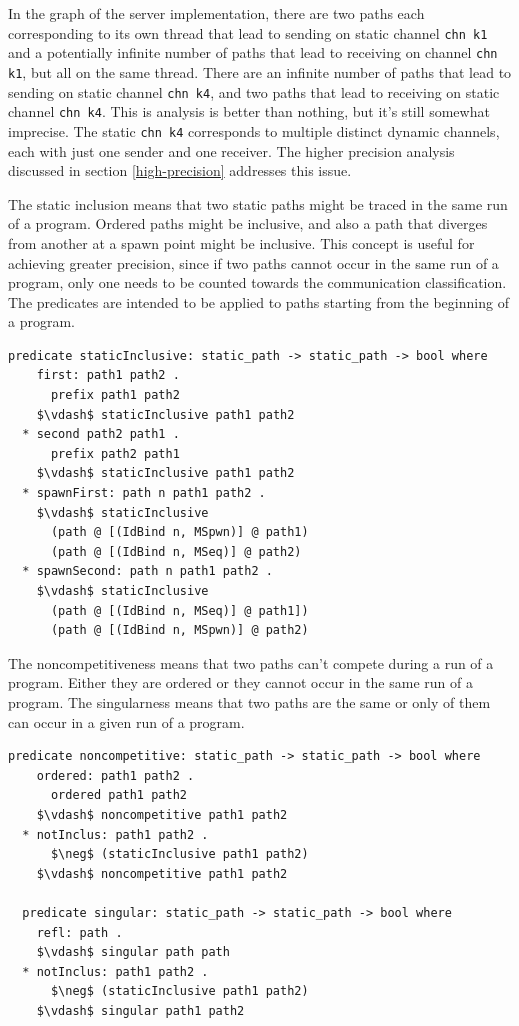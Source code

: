 \documentclass[letterpaper, 11pt]{report}
\begin{document}
In the graph of the server implementation, there are two paths each corresponding to its
own thread that lead
to sending on
static channel \lstinline[language=sugar_lang]{chn k1} and a potentially infinite number of
paths that lead to receiving on
channel \lstinline[language=sugar_lang]{chn k1}, but all on the same thread.
There are an infinite number of paths that lead
to sending on static channel \lstinline[language=sugar_lang]{chn k4}, and two paths
that lead to receiving on static channel
\lstinline[language=sugar_lang]{chn k4}. This is analysis is better than nothing,
but it's still somewhat imprecise. The static \lstinline[language=sugar_lang]{chn k4} corresponds to
multiple distinct dynamic channels, each with just one sender and one receiver. The higher
precision analysis discussed in section \ref{high-precision} addresses this issue.

The static inclusion means that two static paths might be traced in
the same run of a program. Ordered paths might be inclusive, and also a path that diverges
from another at a spawn point might be inclusive. This concept is useful for achieving
greater precision, since if two paths cannot occur in the same run of a program, only one needs
to be counted towards the communication classification. The predicates are intended to be applied
to paths starting from the beginning of a program.

\begin{lstlisting}[language=logic, mathescape]
  predicate staticInclusive: static_path -> static_path -> bool where
    first: path1 path2 .
      prefix path1 path2
    $\vdash$ staticInclusive path1 path2
  * second path2 path1 .
      prefix path2 path1
    $\vdash$ staticInclusive path1 path2
  * spawnFirst: path n path1 path2 .
    $\vdash$ staticInclusive
      (path @ [(IdBind n, MSpwn)] @ path1)
      (path @ [(IdBind n, MSeq)] @ path2)
  * spawnSecond: path n path1 path2 .
    $\vdash$ staticInclusive
      (path @ [(IdBind n, MSeq)] @ path1])
      (path @ [(IdBind n, MSpwn)] @ path2)
\end{lstlisting}

The noncompetitiveness means that two paths can't compete during a run of a
program. Either they are ordered or they cannot occur in the same run of a program.
The singularness means that two paths are the same or only of them can occur
in a given run of a program. 

\begin{lstlisting}[language=logic, mathescape]
  predicate noncompetitive: static_path -> static_path -> bool where
    ordered: path1 path2 .
      ordered path1 path2
    $\vdash$ noncompetitive path1 path2
  * notInclus: path1 path2 .
      $\neg$ (staticInclusive path1 path2)
    $\vdash$ noncompetitive path1 path2

  predicate singular: static_path -> static_path -> bool where
    refl: path .
    $\vdash$ singular path path
  * notInclus: path1 path2 .
      $\neg$ (staticInclusive path1 path2)
    $\vdash$ singular path1 path2
\end{lstlisting}
\end{document}
